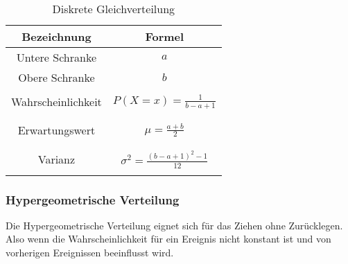 \documentclass[12pt]{scrartcl}
\begin{document}
\begin{table}[h]
    \begin{tabular}{ | c | c | }
        \hline
        Bezeichnung        & Formel                              \\
        \hline
        Untere Schranke    & $a$                                 \\
        Obere Schranke     & $b$                                 \\
        \hline             &                                     \\
        Wahrscheinlichkeit & $P(X=x) = \frac{1}{b-a+1}$          \\&\\&\\
        Erwartungswert     & $\mu = \frac{a+b}{2}$               \\&\\&\\
        Varianz            & $\sigma^2 = \frac{(b-a+1)^2-1}{12}$ \\&\\
        \hline
    \end{tabular}
    \caption{Diskrete Gleichverteilung}
\end{table}

\pagebreak

\subsubsection{Hypergeometrische Verteilung}

Die Hypergeometrische Verteilung eignet sich für das Ziehen ohne Zurücklegen.
Also wenn die Wahrscheinlichkeit für ein Ereignis nicht konstant ist und von vorherigen Ereignissen beeinflusst wird.
\end{document}
